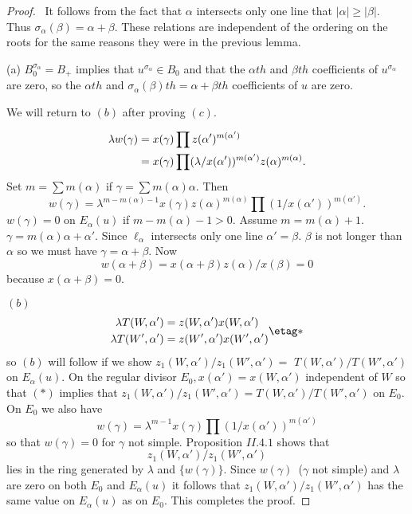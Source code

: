\documentclass{memo-l}
\theoremstyle{definition}
\theoremstyle{remark}
\numberwithin{section}{chapter}
\numberwithin{equation}{chapter}
\begin{document}
\begin{proof} \ It follows from the fact that ${\alpha}$ intersects
only one line that $\vert {\alpha}\vert \ge \vert {\beta}\vert .$ Thus
${\sigma}_{{\alpha}}({\beta})  =  {\alpha}+{\beta}$.  These relations are
independent of the ordering on the roots for the same reasons they were in
the previous lemma.

   (a) $B_{0}^{{\sigma}_{{\alpha}}} =  B_{+}$ implies that
$u^{{\sigma}_{{\alpha}}}  \in  B_{0}$ and that the ${\alpha}th$ and
${\beta}th$ coefficients of $u^{{\sigma}_{{\alpha}}}$ are zero, so
the ${\alpha}th$ and ${\sigma}_{{\alpha}}({\beta})th  =  {\alpha}+{\beta}th$
coefficients of $u$ are zero.

   We will return to $(b)$ after proving $(c)$.

$$
\aligned
{\lambda}w({\gamma})  &=  x({\gamma}) \prod z({\alpha}')^{m({\alpha}')} \\
	    & =  x({\gamma}) \prod ({\lambda}/x({\alpha}'))^{m({\alpha}')}
z({\alpha})^{m({\alpha})}.
\endaligned
$$
Set $m  =  \sum m({\alpha})$ if ${\gamma}  =  \sum m({\alpha}){\alpha}$.
Then
$$
w({\gamma})  =  {\lambda}^{m-m({\alpha})-1}
x({\gamma})z({\alpha})^{m({\alpha})} \prod (1/x({\alpha}'))^{m({\alpha}')}.
$$
$w({\gamma})  =  0$ on $E_{{\alpha}}(u)$ if $m-m({\alpha})-1 > 0$.  Assume
$m = m({\alpha})+1$.  ${\gamma}  =  m({\alpha}){\alpha}+{\alpha}'$.  Since
${\ell}_{{\alpha}}$ intersects only one line ${\alpha}' = {\beta}$.
${\beta}$ is not longer than ${\alpha}$ so we must have ${\gamma}  =
{\alpha}+{\beta}$.  Now
$$
w({\alpha+\beta})  =  x(\alpha+\beta)z(\alpha)/x(\beta)=0$$
because $x({\alpha}+{\beta}) = 0$.

\medskip
   $(b)$
$$
\aligned
\lambda T(W,{\alpha}')  &=  z(W,{\alpha}')x(W,{\alpha}')\\
\lambda T(W',{\alpha}')  &=  z(W',{\alpha}')x(W',{\alpha}')
\endaligned    \etag *
$$
so $(b)$ will follow if we show $z_{1}(W,{\alpha}')/z_{1}(W',{\alpha}')  =$
$T(W,{\alpha}')/T(W',{\alpha}')$ on $E_{{\alpha}}(u)$.  On the regular
divisor $E_{0}, x({\alpha}')  =  x(W,{\alpha}')$ independent of $W$ so that
$(*)$ implies that
\newline
$z_{1}(W,{\alpha}')/z_{1}(W',{\alpha}')  =
T(W,{\alpha}')/T(W',{\alpha}')$ on $E_{0}$.  On $E_{0}$ we also have
$$
w({\gamma})  =  {\lambda}^{m-1}x({\gamma}) \prod (1/x({\alpha}'))^{m({\alpha}')}
$$
so that $w({\gamma})  =  0$ for ${\gamma}$ not simple.  Proposition $II.4.1$
shows that $$z_{1}(W,{\alpha}')/z_{1}(W',{\alpha}')$$ lies in the ring
generated by ${\lambda}$ and $\{w({\gamma})\}$.  Since $w({\gamma})$\
(${\gamma}$ not simple) and ${\lambda}$ are zero on both $E_{0}$ and
$E_{{\alpha}}(u)$ it follows that $z_{1}(W,{\alpha}')/z_{1}(W',{\alpha}')$
has the same value on $E_{{\alpha}}(u)$ as on $E_{0}$.  This completes the
proof.
\end{proof}
\end{document}
